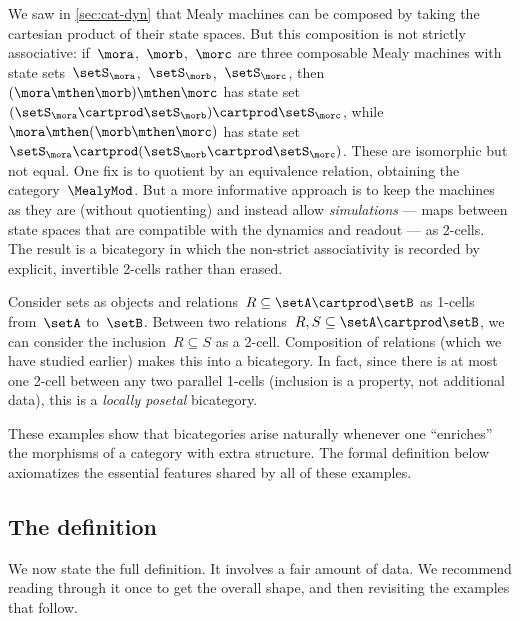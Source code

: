 \begin{example}
    \label{exa:bicat-motivation-mealy}
    We saw in \cref{sec:cat-dyn} that Mealy machines can be composed by taking the cartesian product of their state spaces.
    But this composition is not strictly associative: if~$\mora$,~$\morb$,~$\morc$ are three composable Mealy machines with state sets~$\setS_\mora$,~$\setS_\morb$,~$\setS_\morc$, then~$(\mora \mthen \morb) \mthen \morc$ has state set~$(\setS_\mora \cartprod \setS_\morb) \cartprod \setS_\morc$, while~$\mora \mthen (\morb \mthen \morc)$ has state set~$\setS_\mora \cartprod (\setS_\morb \cartprod \setS_\morc)$.
    These are isomorphic but not equal.
    One fix is to quotient by an equivalence relation, obtaining the category~$\MealyMod$.
    But a more informative approach is to keep the machines as they are (without quotienting) and instead allow \emph{simulations} --- maps between state spaces that are compatible with the dynamics and readout --- as 2-cells.
    The result is a bicategory in which the non-strict associativity is recorded by explicit, invertible 2-cells rather than erased.
\end{example}

\begin{example}[Relations]
    \label{exa:bicat-motivation-rel}
    Consider sets as objects and relations~$R \subseteq \setA \cartprod \setB$ as 1-cells from~$\setA$ to~$\setB$.
    Between two relations~$R, S \subseteq \setA \cartprod \setB$, we can consider the inclusion~$R \subseteq S$ as a 2-cell.
    Composition of relations (which we have studied earlier) makes this into a bicategory.
    In fact, since there is at most one 2-cell between any two parallel 1-cells (inclusion is a property, not additional data), this is a \emph{locally posetal} bicategory.
\end{example}

These examples show that bicategories arise naturally whenever one ``enriches'' the morphisms of a category with extra structure.
The formal definition below axiomatizes the essential features shared by all of these examples.

\subsection{The definition}

We now state the full definition. It involves a fair amount of data. We recommend reading through it once to get the overall shape, and then revisiting the examples that follow.

